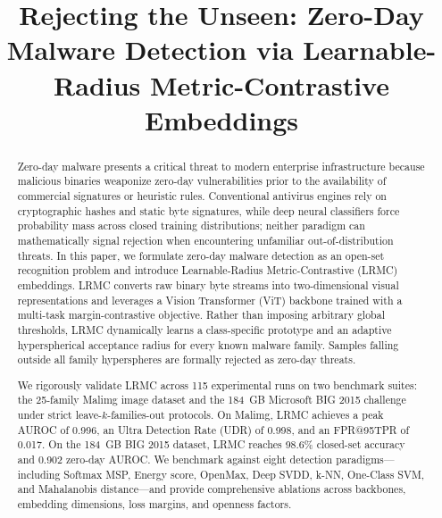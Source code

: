 \documentclass[conference]{IEEEtran}
\begin{document}
\title{Rejecting the Unseen: Zero-Day Malware Detection via Learnable-Radius Metric-Contrastive Embeddings}

\author{
}

\maketitle

\begin{abstract}
Zero-day malware presents a critical threat to modern enterprise infrastructure because malicious binaries weaponize zero-day vulnerabilities prior to the availability of commercial signatures or heuristic rules. Conventional antivirus engines rely on cryptographic hashes and static byte signatures, while deep neural classifiers force probability mass across closed training distributions; neither paradigm can mathematically signal rejection when encountering unfamiliar out-of-distribution threats. In this paper, we formulate zero-day malware detection as an open-set recognition problem and introduce Learnable-Radius Metric-Contrastive (LRMC) embeddings. LRMC converts raw binary byte streams into two-dimensional visual representations and leverages a Vision Transformer (ViT) backbone trained with a multi-task margin-contrastive objective. Rather than imposing arbitrary global thresholds, LRMC dynamically learns a class-specific prototype and an adaptive hyperspherical acceptance radius for every known malware family. Samples falling outside all family hyperspheres are formally rejected as zero-day threats. 

We rigorously validate LRMC across 115 experimental runs on two benchmark suites: the 25-family Malimg image dataset and the 184~GB Microsoft BIG 2015 challenge under strict leave-$k$-families-out protocols. On Malimg, LRMC achieves a peak AUROC of 0.996, an Ultra Detection Rate (UDR) of 0.998, and an FPR@95TPR of 0.017. On the 184~GB BIG 2015 dataset, LRMC reaches 98.6\% closed-set accuracy and 0.902 zero-day AUROC. We benchmark against eight detection paradigms—including Softmax MSP, Energy score, OpenMax, Deep SVDD, k-NN, One-Class SVM, and Mahalanobis distance—and provide comprehensive ablations across backbones, embedding dimensions, loss margins, and openness factors.
\end{abstract}
\end{document}
